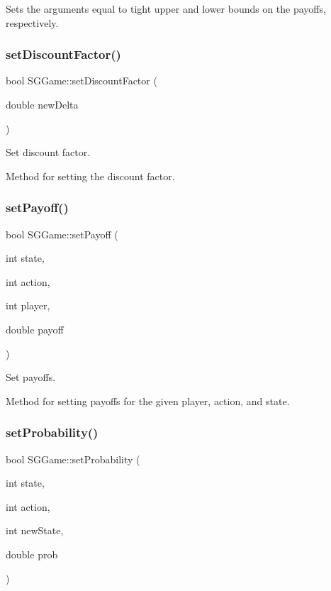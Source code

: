 Sets the arguments equal to tight upper and lower bounds on the payoffs, respectively. \mbox{\label{classSGGame_ad5879878c647da7040940469b56b9595}} 
\subsubsection{\texorpdfstring{set\+Discount\+Factor()}{setDiscountFactor()}}
{\footnotesize\ttfamily bool S\+G\+Game\+::set\+Discount\+Factor (\begin{DoxyParamCaption}\item[{double}]{new\+Delta }\end{DoxyParamCaption})}



Set discount factor. 

Method for setting the discount factor. \mbox{\label{classSGGame_a36b2269c87d27ab3e0278ad44b6bbddc}} 
\subsubsection{\texorpdfstring{set\+Payoff()}{setPayoff()}}
{\footnotesize\ttfamily bool S\+G\+Game\+::set\+Payoff (\begin{DoxyParamCaption}\item[{int}]{state,  }\item[{int}]{action,  }\item[{int}]{player,  }\item[{double}]{payoff }\end{DoxyParamCaption})}



Set payoffs. 

Method for setting payoffs for the given player, action, and state. \mbox{\label{classSGGame_afcc31eacca8f294d349905d52c9a5f64}} 
\subsubsection{\texorpdfstring{set\+Probability()}{setProbability()}}
{\footnotesize\ttfamily bool S\+G\+Game\+::set\+Probability (\begin{DoxyParamCaption}\item[{int}]{state,  }\item[{int}]{action,  }\item[{int}]{new\+State,  }\item[{double}]{prob }\end{DoxyParamCaption})}



